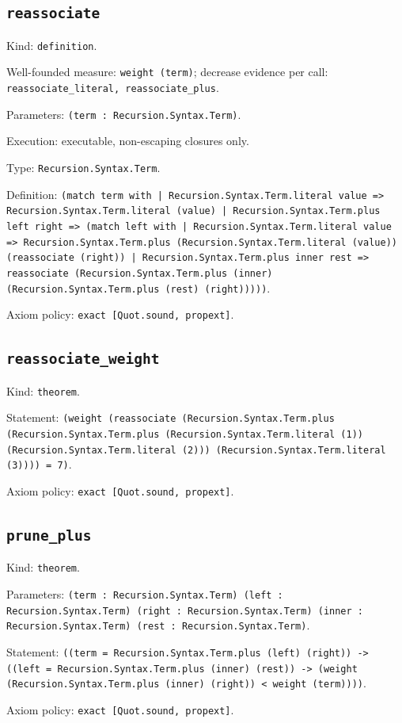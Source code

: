 \documentclass[11pt]{article}
\begin{document}
\subsection*{\texttt{reassociate}}
\noindent Kind: \texttt{definition}.\par
\noindent Well-founded measure: \texttt{weight (term)}; decrease evidence per call: \texttt{reassociate\_literal, reassociate\_plus}.\par
\noindent Parameters: \texttt{(term : Recursion.Syntax.Term)}.\par
\noindent Execution: executable, non-escaping closures only.\par
\noindent Type: \texttt{Recursion.Syntax.Term}.\par
\noindent Definition: \texttt{(match term with | Recursion.Syntax.Term.literal value => Recursion.Syntax.Term.literal (value) | Recursion.Syntax.Term.plus left right => (match left with | Recursion.Syntax.Term.literal value => Recursion.Syntax.Term.plus (Recursion.Syntax.Term.literal (value)) (reassociate (right)) | Recursion.Syntax.Term.plus inner rest => reassociate (Recursion.Syntax.Term.plus (inner) (Recursion.Syntax.Term.plus (rest) (right)))))}.\par
\noindent Axiom policy: \texttt{exact [Quot.sound, propext]}.\par
\subsection*{\texttt{reassociate\_weight}}
\noindent Kind: \texttt{theorem}.\par
\noindent Statement: \texttt{(weight (reassociate (Recursion.Syntax.Term.plus (Recursion.Syntax.Term.plus (Recursion.Syntax.Term.literal (1)) (Recursion.Syntax.Term.literal (2))) (Recursion.Syntax.Term.literal (3)))) = 7)}.\par
\noindent Axiom policy: \texttt{exact [Quot.sound, propext]}.\par
\subsection*{\texttt{prune\_plus}}
\noindent Kind: \texttt{theorem}.\par
\noindent Parameters: \texttt{(term : Recursion.Syntax.Term) (left : Recursion.Syntax.Term) (right : Recursion.Syntax.Term) (inner : Recursion.Syntax.Term) (rest : Recursion.Syntax.Term)}.\par
\noindent Statement: \texttt{((term = Recursion.Syntax.Term.plus (left) (right)) -> ((left = Recursion.Syntax.Term.plus (inner) (rest)) -> (weight (Recursion.Syntax.Term.plus (inner) (right)) < weight (term))))}.\par
\noindent Axiom policy: \texttt{exact [Quot.sound, propext]}.\par
\end{document}
